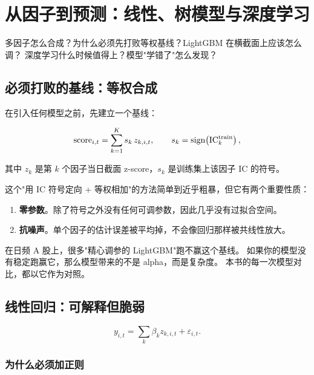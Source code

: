 \chapter{从因子到预测：线性、树模型与深度学习}\label{ch:model}

\begin{keybox}[本章要回答的问题]
多因子怎么合成？为什么必须先打败等权基线？LightGBM 在横截面上应该怎么调？
深度学习什么时候值得上？模型"学错了"怎么发现？
\end{keybox}

\section{必须打败的基线：等权合成}

在引入任何模型之前，先建立一个基线：

\begin{equation}
  \text{score}_{i,t} = \sum_{k=1}^{K} s_k\, z_{k,i,t},
  \qquad
  s_k = \mathrm{sign}\!\left(\mathrm{IC}_k^{\text{train}}\right),
\end{equation}

其中 $z_k$ 是第 $k$ 个因子当日截面 z-score，$s_k$ 是训练集上该因子 IC 的符号。

这个"用 IC 符号定向 + 等权相加"的方法简单到近乎粗暴，但它有两个重要性质：

\begin{enumerate}
  \item \textbf{零参数}。除了符号之外没有任何可调参数，因此几乎没有过拟合空间。
  \item \textbf{抗噪声}。单个因子的估计误差被平均掉，不会像回归那样被共线性放大。
\end{enumerate}

\begin{warnbox}[一个残酷的经验]
在日频 A 股上，很多"精心调参的 LightGBM"跑不赢这个基线。
如果你的模型没有稳定跑赢它，那么模型带来的不是 alpha，而是复杂度。
本书的每一次模型对比，都以它作为对照。
\end{warnbox}

\section{线性回归：可解释但脆弱}

\begin{equation}
  y_{i,t} = \sum_{k}\beta_k z_{k,i,t} + \varepsilon_{i,t}.
\end{equation}

\subsection{为什么必须加正则}

